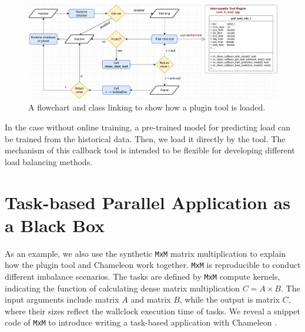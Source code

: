 \begin{figure}[t]
	\centering
	\includegraphics[scale=0.525]{./pictures/poc_implementation/poc_chamtool_flowchart.pdf}
	\caption{A flowchart and class linking to show how a plugin tool is loaded.}
	\label{fig:poc_chamtool_flowchart}
\end{figure}

In the case without online training, a pre-trained model for predicting load can be trained from the historical data. Then, we load it directly by the tool. The mechanism of this callback tool is intended to be flexible for developing different load balancing methods.

\section{Task-based Parallel Application as a Black Box} \label{sec:cham_proactlb_example}

As an example, we also use the synthetic \texttt{MxM} matrix multiplication to explain how the plugin tool and Chameleon work together. \texttt{MxM} is reproducible to conduct different imbalance scenarios. The tasks are defined by \texttt{MxM} compute kernels, indicating the function of calculating dense matrix multiplication $C = A \times B$. The input arguments include matrix $A$ and matrix $B$, while the output is matrix $C$, where their sizes reflect the wallclock execution time of tasks. We reveal a snippet code of \texttt{MxM} to introduce writing a task-based application with Chameleon \cite{Klinkenberg2020ChameleonReactLB}.

